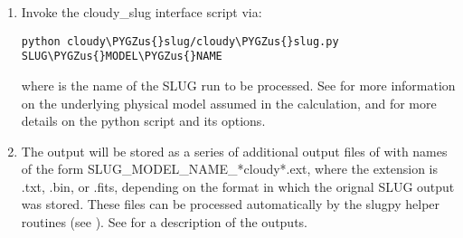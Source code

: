 \documentclass[letterpaper,10pt,english]{sphinxmanual}
\def\PYGZus{\char`\_}
\begin{document}
\begin{enumerate}
\item {} 
Invoke the cloudy\_slug interface script via:

\begin{Verbatim}[commandchars=\\\{\}]
python cloudy\PYGZus{}slug/cloudy\PYGZus{}slug.py SLUG\PYGZus{}MODEL\PYGZus{}NAME
\end{Verbatim}

where  is the name of the SLUG run to be
processed. See {\hyperref[cloudy:ssec-cloudy-cluster]{\emph{}}} for more information on
the underlying physical model assumed in the calculation, and
{\hyperref[cloudy:ssec-cloudy-slug-options]{\emph{}}} for more details on the python
script and its options.

\item {} 
The output will be stored as a series of additional output files of
with names of the form SLUG\_MODEL\_NAME\_*cloudy*.ext, where the
extension is .txt, .bin, or .fits, depending on the format in which
the orignal SLUG output was stored. These files can be processed
automatically by the slugpy helper routines (see
{\hyperref[slugpy:sec-slugpy]{\emph{}}}). See {\hyperref[cloudy:ssec-cloudy-output]{\emph{}}} for a description
of the outputs.

\end{enumerate}
\end{document}

